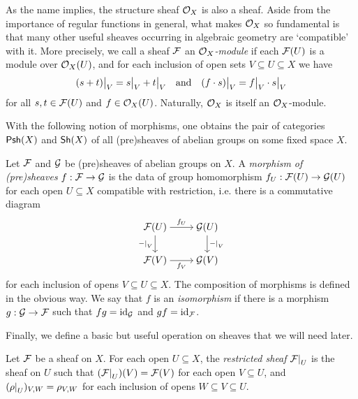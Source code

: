 \begin{example}
  As the name implies, the structure sheaf $\mathcal{O}_{{X}}$ is also a sheaf.
  Aside from the importance of regular functions in general, what
  makes $\mathcal{O}_{{X}}$ so fundamental is that many other useful sheaves
  occurring in algebraic geometry are `compatible' with it.
  More precisely, we call a sheaf $\mathcal{F}$ an
  \emph{$\mathcal{O}_{{X}}$-module} if each $\mathcal{F}(U)$ is a module over
  $\mathcal{O}_{{X}}(U)$, and for each inclusion of open sets $V \subseteq U
  \subseteq X$ we have
  \[
    \setres{(s + t)}{V} = \setres{s}{V} + \setres{t}{V}
    \mathand
    \setres{(f \cdot s)}{V} = \setres{f}{V} \cdot \setres{s}{V}
  \]
  for all $s, t \in \mathcal{F}(U)$ and $f \in \mathcal{O}_{{X}}(U)$.
  Naturally, $\mathcal{O}_{{X}}$ is itself an $\mathcal{O}_{{X}}$-module.
\end{example}

With the following notion of morphisms, one obtains the pair of
categories $\mathsf{Psh}({X})$ and $\mathsf{Sh}({X})$ of all (pre)sheaves of abelian
groups on some fixed space $X$.

\begin{definition}
  \label{def_general_sheaf_morphism}
  Let $\mathcal{F}$ and $\mathcal{G}$ be (pre)sheaves of abelian groups on $X$.
  A \emph{morphism of (pre)sheaves} $f: \mathcal{F} \to \mathcal{G}$ is the
  data of group homomorphism $f_U: \mathcal{F}(U) \to \mathcal{G}(U)$ for
  each open $U \subseteq X$ compatible with restriction, i.e. there
  is a commutative diagram
  \[
    \begin{tikzcd}[cramped]
      {\shf{F}(U)} & {\shf{G}(U)} \\
      {\shf{F}(V)} & {\shf{G}(V)}
      \arrow["{f_U}", from=1-1, to=1-2]
      \arrow["{\setres{-}{V}}"', from=1-1, to=2-1]
      \arrow["{\setres{-}{V}}", from=1-2, to=2-2]
      \arrow["{f_V}"', from=2-1, to=2-2]
    \end{tikzcd}
  \]
  for each inclusion of opens $V \subseteq U \subseteq X$.
  The composition of morphisms is defined in the obvious way.
  We say that $f$ is an \emph{isomorphism} if there is a morphism $g:
  \mathcal{G} \to \mathcal{F}$ such that $fg = \operatorname{id}_{\mathcal{G}}$ and $gf = \operatorname{id}_{\mathcal{F}}$.
\end{definition}

Finally, we define a basic but useful operation on sheaves that we
will need later.

\begin{definition}
  Let $\mathcal{F}$ be a sheaf on $X$.
  For each open $U \subseteq X$, the \emph{restricted sheaf}
  $\setres{\shf{F}}{U}$ is the sheaf on $U$ such that
  $(\setres{\shf{F}}{U})(V) = \shf{F}(V)$ for each open $V \subseteq
  U$, and $(\setres{\rho}{U})_{V, W} = \res{V}{W}$ for each inclusion
  of opens $W \subseteq V \subseteq U$.
\end{definition}
